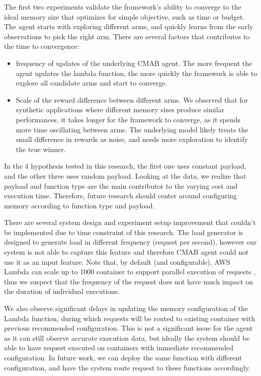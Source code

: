 \documentclass[conference]{IEEEtran}
\begin{document}
The first two experiments validate the framework's ability to converge to the ideal memory size that optimizes for simple objective, such as time or budget. The agent starts with exploring different arms, and quickly learns from the early observations to pick the right arm. There are several factors that contributes to the time to convergence: 
\begin{itemize}
    \item frequency of updates of the underlying CMAB agent. The more frequent the agent updates the lambda function, the more quickly the framework is able to explore all candidate arms and start to converge.
    \item Scale of the reward difference between different arms. We observed that for synthetic applications where different memory sizes produce similar performances, it takes longer for the framework to converge, as it spends more time oscillating between arms. The underlying model likely treats the small difference in rewards as noise, and needs more exploration to identify the true winner.
\end{itemize}



In the 4 hypothesis tested in this research, the first one uses constant payload, and the other three uses random payload. Looking at the data, we realize that payload and function type are the main contributor to the varying cost and execution time. Therefore, future research should center around configuring memory according to function type and payload.

There are several system design and experiment setup improvement that couldn't be implemented due to time constraint of this research. The load generator is designed to generate load in different frequency (request per second), however our system is not able to capture this feature and therefore CMAB agent could not use it as an input feature. Note that, by default (and configurable), AWS Lambda can scale up to 1000 container to support parallel execution of requests \cite{Lambda_function_scaling}, thus we suspect that the frequency of the request does not have much impact on the duration of individual executions.

We also observe significant delays in updating the memory configuration of the Lambda function, during which requests will be routed to existing container with previous recommended configuration. This is not a significant issue for the agent as it can still observe accurate execution data, but ideally the system should be able to have request executed on containers with immediate recommended configuration. In future work, we can deploy the same function with different configuration, and have the system route request to these functions accordingly.
\end{document}
